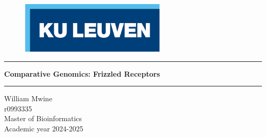 \begin{figure}[h]
\includegraphics[width=7cm]{Figures/logo_kul.png}
\end{figure}
\vspace*{5cm}

\begin{center}
\hrule 
\vspace{0.5cm}
\noindent
\huge{\textbf{Comparative Genomics: Frizzled Receptors}} \\ 
\vspace{1cm}
\hrule 
\vfill
\end{center}

\begin{flushright}
\large{William Mwine} \\
\large{r0993335} \\
\normalsize{Master of Bioinformatics} \\
\normalsize{Academic year 2024-2025}
\end{flushright}

\vspace{1cm}